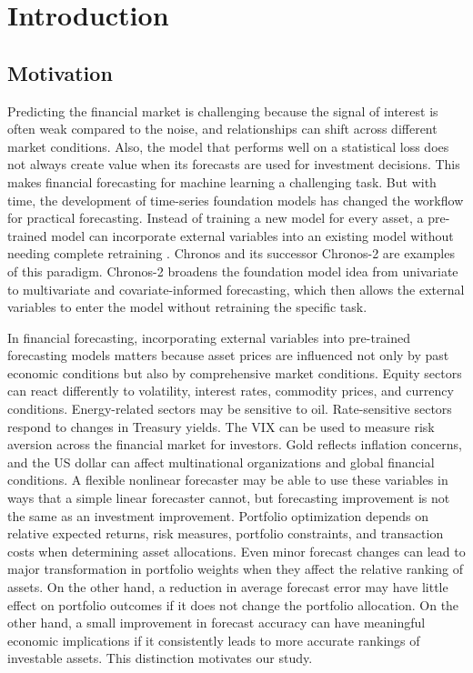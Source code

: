 \documentclass[12pt,a4paper,twoside,openany]{book}
\begin{document}
\chapter{Introduction}\label{introduction}

\section{Motivation}\label{motivation}
Predicting the financial market is challenging because the signal of interest is often weak compared to the noise, and relationships can shift across different market conditions. Also, the model that performs well on a statistical loss does not always create value when its forecasts are used for investment decisions. This makes financial forecasting for machine learning a challenging task. But with time, the development of time-series foundation models has changed the workflow for practical forecasting. Instead of training a new model for every asset, a pre-trained model can incorporate external variables into an existing model without needing complete retraining \cite{arango2025chronosx}. Chronos and its successor Chronos-2 are examples of this paradigm. Chronos-2 broadens the foundation model idea from univariate to multivariate and covariate-informed forecasting, which then allows the external variables to enter the model without retraining the specific task.

In financial forecasting, incorporating external variables into pre-trained forecasting models matters because asset prices are influenced not only by past economic conditions but also by comprehensive market conditions. Equity sectors can react differently to volatility, interest rates, commodity prices, and currency conditions. Energy-related sectors may be sensitive to oil. Rate-sensitive sectors respond to changes in Treasury yields. The VIX can be used to measure risk aversion across the financial market for investors. Gold reflects inflation concerns, and the US dollar can affect multinational organizations and global financial conditions. A flexible nonlinear forecaster may be able to use these variables in ways that a simple linear forecaster cannot, but forecasting improvement is not the same as an investment improvement. Portfolio optimization depends on relative expected returns, risk measures, portfolio constraints, and transaction costs when determining asset allocations. Even minor forecast changes can lead to major transformation in portfolio weights when they affect the relative ranking of assets. On the other hand, a reduction in average forecast error may have little effect on portfolio outcomes if it does not change the portfolio allocation. On the other hand, a small improvement in forecast accuracy can have meaningful economic implications if it consistently leads to more accurate rankings of investable assets. This distinction motivates our study.
\end{document}
